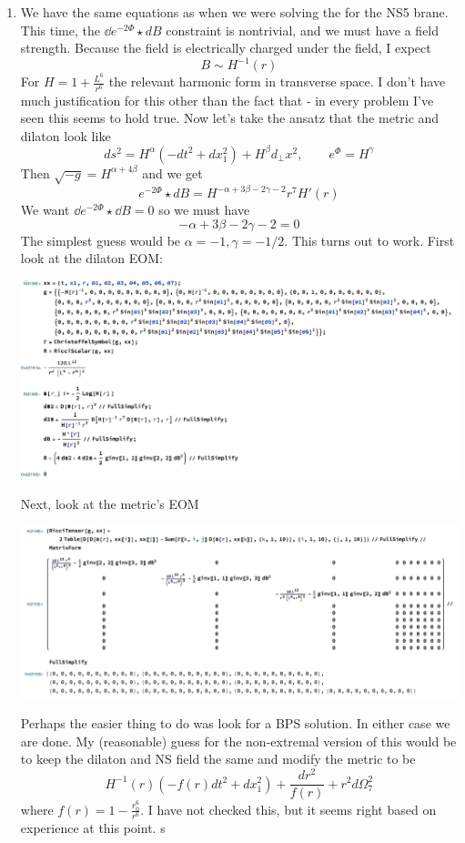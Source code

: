 \documentclass[11pt, class=article, crop=false]{standalone}
\begin{document}
\begin{enumerate}
	\item We have the same equations as when we were solving the for the NS5 brane. 
	This time, the $\dd e^{-2 \Phi} \star dB$ constraint is nontrivial, and we must have a field strength. Because the field is electrically charged under the field, I expect 
	\[
		B \sim H^{-1}(r)
	\]
	For $H = 1 + \frac{L^6}{r^6}$ the relevant harmonic form in transverse space. I don't have much justification for this other than the fact that - in every problem I've seen this seems to hold true. Now let's take the ansatz that the metric and dilaton look like
	\[
		ds^2 = H^{\alpha} (-dt^2 + dx_1^2) + H^{\beta} d_\perp x^2, \qquad e^{\Phi} = H^{\gamma}
	\]
	Then $\sqrt{-g} = H^{\alpha + 4 \beta}$ and we get
	\[
		e^{-2\Phi} \star dB  = H^{-\alpha + 3\beta -2 \gamma - 2} r^7 H'(r)
	\]
	We want $\dd e^{-2\Phi}  \star \dd B = 0$ so we must have
	\[
		-\alpha + 3 \beta - 2\gamma - 2 = 0
	\]
	The simplest guess would be $\alpha = -1, \gamma = -1/2$. This turns out to work. First look at the dilaton EOM: 
	\begin{center}
		\includegraphics[scale=0.5]{"Figures/F1 1"}
	\end{center}
	Next, look at the metric's EOM
	\begin{center}
		\includegraphics[scale=0.5]{"Figures/F1 2"}
	\end{center}
	
	Perhaps the easier thing to do was look for a BPS solution. In either case we are done. My (reasonable) 
guess for the non-extremal version of this would be to keep the dilaton and NS field the same and modify the metric to be
	\[
		H^{-1}(r) (-f(r) dt^2 + dx^2_1) + \frac{dr^2}{f(r)} + r^2 d\Omega_{7}^2
	\]
	where $f(r) = 1 - \frac{r_0^6}{r^6}$. I have not checked this, but it seems right based on experience at this point. s
	

\end{enumerate}
\end{document}
